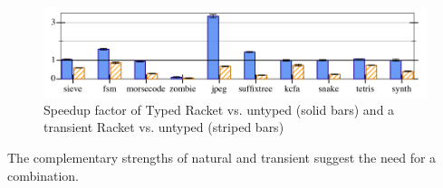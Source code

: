 \begin{figure}[h]
  \includegraphics[width=0.8\columnwidth]{src/icfp-bars.png}
  \caption{Speedup factor of Typed Racket vs. untyped (solid bars) and a transient Racket vs. untyped (striped bars)~\cite{gf-icfp-2018}}
  \label{fig:icfp-bars}
\end{figure}

\noindent
The complementary strengths of natural and transient suggest the need for a
 combination.

